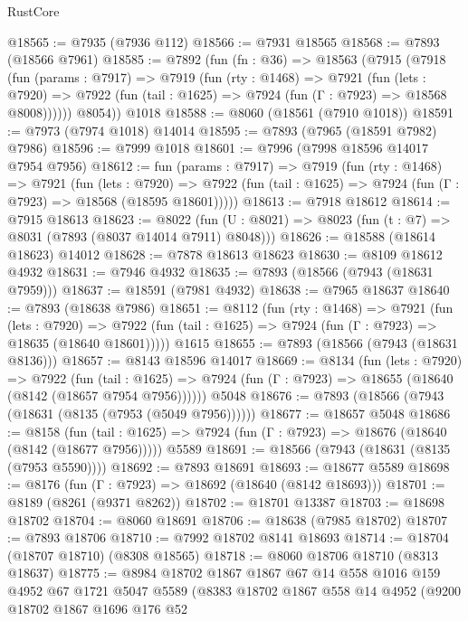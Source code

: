 \begin{lexlean}{RustCore}
\begin{coremodule}
@18565 := @7935 (@7936 @112)
@18566 := @7931 @18565
@18568 := @7893 (@18566 @7961)
@18585 := @7892
    (fun (fn : @36) =>
    @18563
      (@7915
        (@7918
          (fun (params : @7917) =>
          @7919
            (fun (rty : @1468) =>
            @7921
              (fun (lets : @7920) =>
              @7922 (fun (tail : @1625) => @7924 (fun (Γ : @7923) => @18568 @8008))))))
        @8054))
    @1018
@18588 := @8060 (@18561 (@7910 @1018))
@18591 := @7973 (@7974 @1018) @14014
@18595 := @7893 (@7965 (@18591 @7982) @7986)
@18596 := @7999 @1018
@18601 := @7996 (@7998 @18596 @14017 @7954 @7956)
@18612 := fun (params : @7917) =>
  @7919
    (fun (rty : @1468) =>
    @7921
      (fun (lets : @7920) =>
      @7922 (fun (tail : @1625) => @7924 (fun (Γ : @7923) => @18568 (@18595 @18601)))))
@18613 := @7918 @18612
@18614 := @7915 @18613
@18623 := @8022
    (fun (U : @8021) => @8023 (fun (t : @7) => @8031 (@7893 (@8037 @14014 @7911) @8048)))
@18626 := @18588 (@18614 @18623) @14012
@18628 := @7878 @18613 @18623
@18630 := @8109 @18612 @4932
@18631 := @7946 @4932
@18635 := @7893 (@18566 (@7943 (@18631 @7959)))
@18637 := @18591 (@7981 @4932)
@18638 := @7965 @18637
@18640 := @7893 (@18638 @7986)
@18651 := @8112
    (fun (rty : @1468) =>
    @7921
      (fun (lets : @7920) =>
      @7922 (fun (tail : @1625) => @7924 (fun (Γ : @7923) => @18635 (@18640 @18601)))))
    @1615
@18655 := @7893 (@18566 (@7943 (@18631 @8136)))
@18657 := @8143 @18596 @14017
@18669 := @8134
    (fun (lets : @7920) =>
    @7922
      (fun (tail : @1625) =>
      @7924 (fun (Γ : @7923) => @18655 (@18640 (@8142 (@18657 @7954 @7956))))))
    @5048
@18676 := @7893 (@18566 (@7943 (@18631 (@8135 (@7953 (@5049 @7956))))))
@18677 := @18657 @5048
@18686 := @8158
    (fun (tail : @1625) => @7924 (fun (Γ : @7923) => @18676 (@18640 (@8142 (@18677 @7956)))))
    @5589
@18691 := @18566 (@7943 (@18631 (@8135 (@7953 @5590))))
@18692 := @7893 @18691
@18693 := @18677 @5589
@18698 := @8176 (fun (Γ : @7923) => @18692 (@18640 (@8142 @18693)))
@18701 := @8189 (@8261 (@9371 @8262))
@18702 := @18701 @13387
@18703 := @18698 @18702
@18704 := @8060 @18691
@18706 := @18638 (@7985 @18702)
@18707 := @7893 @18706
@18710 := @7992 @18702 @8141 @18693
@18714 := @18704 (@18707 @18710) (@8308 @18565)
@18718 := @8060 @18706 @18710 (@8313 @18637)
@18775 := @8984
    @18702
    @1867
    @1867
    @67
    @14
    @558
    @1016
    @159
    @4952
    @67
    @1721
    @5047
    @5589
    (@8383
      @18702
      @1867
      @558
      @14
      @4952
      (@9200
        @18702
        @1867
        @1696
        @176
        @52

\end{coremodule}
\end{lexlean}

